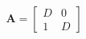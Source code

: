 \documentclass[12 pt]{slides}
\begin{document}
\begingroup
\[\textbf{A} = \begin{bmatrix}D & 0\\1 & D\end{bmatrix}\]
\endgroup
\end{document}
